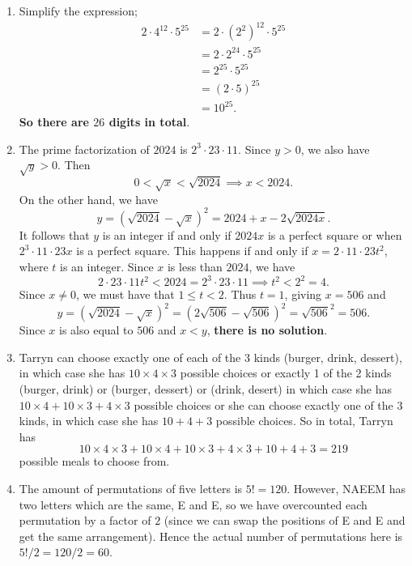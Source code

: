 \documentclass[12pt]{article}
\begin{document}
\begin{enumerate}[topsep=\bigskipamount,itemsep=\bigskipamount]
\item Simplify the expression;
\begin{align*}
    2\cdot 4^{12}\cdot5^{25} &= 2\cdot(2^{2})^{12}\cdot5^{25}\\
    &=2\cdot2^{24}\cdot5^{25}\\
    &=2^{25}\cdot5^{25}\\
    &=(2\cdot5)^{25}\\
    &=10^{25}.
\end{align*}
\textbf{So there are $26$ digits in total}.

\item The prime factorization of $2024$ is $2^{3}\cdot23\cdot11$. Since $y>0$, we also have $\sqrt{y}>0$. Then 
\begin{equation*}
    0<\sqrt{x}< \sqrt{2024} \implies x<2024.
\end{equation*}
On the other hand, we have 
\begin{equation*}
    y= (\sqrt{2024}-\sqrt{x})^{2}=2024+x-2\sqrt{2024x}. 
\end{equation*}
It follows that $y$ is an integer if and only if $2024x$ is a perfect square or when $2^{3}\cdot11\cdot23x$ is a perfect square. This happens if and only if $x=2\cdot11\cdot23t^{2}$, where $t$ is an integer. Since $x$ is less than $2024$, we have 
\begin{equation*}
    2\cdot23\cdot11t^{2}<2024=2^{3}\cdot23\cdot11 \implies t^{2}<2^{2}=4.
\end{equation*}
Since $x \neq 0$, we must have that $1\leq t<2$.
Thus $t = 1$, giving $x = 506$ and
\[ y = \left(\sqrt{2024}-\sqrt{x}\right)^2 = \left(2\sqrt{506}-\sqrt{506}\right)^2 = \sqrt{506}^2 = 506. \]
Since $x$ is also equal to $506$ and $x < y$,
\textbf{there is no  solution}.

\item Tarryn can choose exactly one of each of the 3 kinds (burger, drink, dessert), in which case she has $10\times 4\times 3$ possible choices or exactly 1 of the 2 kinds (burger, drink) or (burger, dessert) or (drink, desert) in which case she has $10\times 4 + 10\times 3 + 4\times 3$ possible choices or she can choose exactly one of the 3 kinds, in which case she has $10+4+3$ possible choices. So in total, Tarryn has 
\[ 10\times 4\times 3 + 10\times 4 + 10\times 3 + 4\times 3 + 10 + 4 + 3 = 219 \] possible meals to choose from.

\item The amount of permutations of five letters is $5! = 120$.
However, NAEEM has two letters which are the same, E and E, so we have overcounted each permutation by a factor of $2$ (since we can swap the positions of E and E and get the same arrangement).
Hence the actual number of permutations here is $5!/2 = 120/2 = 60$.


\end{enumerate}
\end{document}
